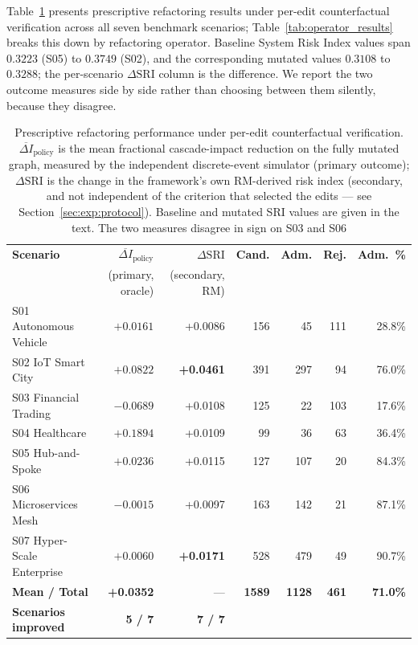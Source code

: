 Table~\ref{tab:prescriptive_results} presents prescriptive refactoring results under per-edit counterfactual verification across all seven benchmark scenarios; Table~\ref{tab:operator_results} breaks this down by refactoring operator. Baseline System Risk Index values span $0.3223$ (S05) to $0.3749$ (S02), and the corresponding mutated values $0.3108$ to $0.3288$; the per-scenario $\Delta\mathrm{SRI}$ column is the difference. We report the two outcome measures side by side rather than choosing between them silently, because they disagree.

\begin{table}[htbp]
\centering
\footnotesize
\setlength{\tabcolsep}{2.5pt}
\caption{Prescriptive refactoring performance under per-edit counterfactual verification. $\overline{\Delta I}_{\text{policy}}$ is the mean fractional cascade-impact reduction on the fully mutated graph, measured by the independent discrete-event simulator (primary outcome); $\Delta\mathrm{SRI}$ is the change in the framework's own RM-derived risk index (secondary, and not independent of the criterion that selected the edits --- see Section~\ref{sec:exp:protocol}). Baseline and mutated SRI values are given in the text. The two measures disagree in sign on S03 and S06}
\label{tab:prescriptive_results}
\begin{tabular}{lrrrrrr}
\toprule
\textbf{Scenario} & $\overline{\Delta I}_{\text{policy}}$ & $\Delta\mathrm{SRI}$ & \textbf{Cand.} & \textbf{Adm.} & \textbf{Rej.} & \textbf{Adm.\ \%} \\
 & \scriptsize(primary, oracle) & \scriptsize(secondary, RM) & & & & \\
\midrule
S01 Autonomous Vehicle & $+0.0161$ & +0.0086 & 156 & 45 & 111 & 28.8\% \\
S02 IoT Smart City & $+0.0822$ & \textbf{+0.0461} & 391 & 297 & 94 & 76.0\% \\
S03 Financial Trading & $\mathbf{-0.0689}$ & +0.0108 & 125 & 22 & 103 & 17.6\% \\
S04 Healthcare & $\mathbf{+0.1894}$ & +0.0109 & 99 & 36 & 63 & 36.4\% \\
S05 Hub-and-Spoke & $+0.0236$ & +0.0115 & 127 & 107 & 20 & 84.3\% \\
S06 Microservices Mesh & $\mathbf{-0.0015}$ & +0.0097 & 163 & 142 & 21 & 87.1\% \\
S07 Hyper-Scale Enterprise & $+0.0060$ & \textbf{+0.0171} & 528 & 479 & 49 & 90.7\% \\
\midrule
\textbf{Mean / Total} & \textbf{+0.0352} & --- & \textbf{1589} & \textbf{1128} & \textbf{461} & \textbf{71.0\%} \\
\textbf{Scenarios improved} & \textbf{5 / 7} & \textbf{7 / 7} & & & & \\
\bottomrule
\end{tabular}
\end{table}

